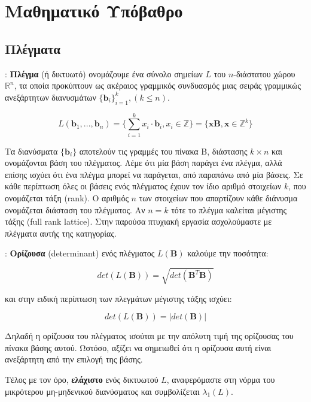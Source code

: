 \section{Μαθηματικό Υπόβαθρο}
\label{chapBackground}

\subsection{Πλέγματα}

\begin{definition}:
 \textbf{ Πλέγμα } (ή δικτυωτό) ονομάζουμε ένα σύνολο σημείων $L$ του $n$-διάστατου χώρου $	\mathbb{R}^n$, τα οποία προκύπτουν ως ακέραιος γραμμικός συνδυασμός μιας σειράς γραμμικώς ανεξάρτητων διανυσμάτων $\{{ \bm b_i}\}_{i=1}^k, (k \leq n)$.
 
 $$ L(\bm b_1, ...,\bm b_n) = \bigg\{ \sum_{i=1}^{k} x_i \cdot \bm b_i, x_i \in \mathbb{Z}  \bigg\} = \bigg\{ \bm x \bm B, \bm x \in \mathbb{Z}^k \bigg\}$$

\end{definition}

Τα διανύσματα $ \{\bm b_i \}$ αποτελούν τις γραμμές του πίνακα Β, διάστασης $ k \times n $ και ονομάζονται βάση του πλέγματος. Λέμε ότι μία βάση παράγει ένα πλέγμα, αλλά επίσης ισχύει ότι ένα πλέγμα μπορεί να παράγεται, από παραπάνω από μία βάσεις. Σε κάθε περίπτωση όλες οι βάσεις ενός πλέγματος έχουν τον ίδιο αριθμό στοιχείων $ k $, που ονομάζεται τάξη (\lt rank). O αριθμός $ n $ των στοιχείων που απαρτίζουν κάθε διάνυσμα ονομάζεται διάσταση του πλέγματος. Αν $ n=k $ τότε το πλέγμα καλείται μέγιστης τάξης (\lt full rank lattice). Στην παρούσα πτυχιακή εργασία ασχολούμαστε με πλέγματα αυτής της κατηγορίας.

\begin{definition}:
 \textbf{Ορίζουσα} (\lt determinant) ενός πλέγματος $ L(\bm B) $ καλούμε την ποσότητα:
 
 $$ det(L(\bm B)) = \sqrt{det(\bm B^T \bm B)}$$
 
και στην ειδική περίπτωση των πλεγμάτων μέγιστης τάξης ισχύει:

$$ det(L(\bm B)) = | det(\bm B) | $$

Δηλαδή η ορίζουσα του πλέγματος ισούται με την απόλυτη τιμή της ορίζουσας του πίνακα βάσης αυτού. Ωστόσο, αξίζει να σημειωθεί ότι η ορίζουσα αυτή είναι ανεξάρτητη από την επιλογή της βάσης.
 
\end{definition}

Τέλος με τον όρο, \textbf{ελάχιστο} ενός δικτυωτού $ L $, αναφερόμαστε στη νόρμα του μικρότερου μη-μηδενικού διανύσματος και συμβολίζεται $ \lambda_1(L) $.

